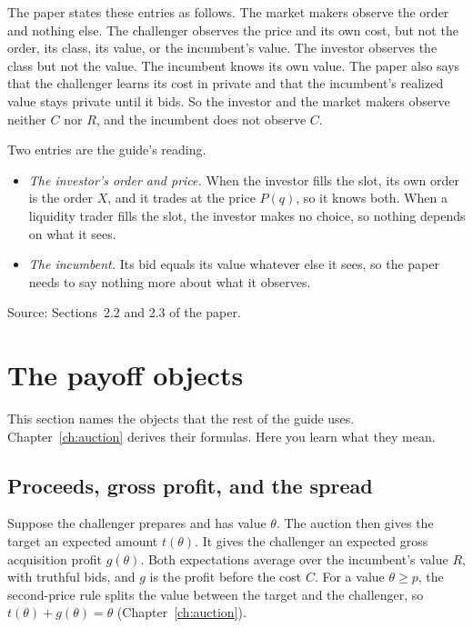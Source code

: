 The paper states these entries as follows.
The market makers observe the order and nothing else.
The challenger observes the price and its own cost, but not the order, its class, its value, or the incumbent's value.
The investor observes the class but not the value.
The incumbent knows its own value.
The paper also says that the challenger learns its cost in private and that the incumbent's realized value stays private until it bids.
So the investor and the market makers observe neither \(C\) nor \(R\), and the incumbent does not observe \(C\).

Two entries are the guide's reading.
\begin{itemize}
\item \emph{The investor's order and price.} When the investor fills the slot, its own order is the order \(X\), and it trades at the price \(P(q)\), so it knows both. When a liquidity trader fills the slot, the investor makes no choice, so nothing depends on what it sees.
\item \emph{The incumbent.} Its bid equals its value whatever else it sees, so the paper needs to say nothing more about what it observes.
\end{itemize}

{\small\color{notegrey}Source: Sections~2.2 and 2.3 of the paper.}

\section{The payoff objects}\label{sec:model-payoffs}

This section names the objects that the rest of the guide uses.
Chapter~\ref{ch:auction} derives their formulas. Here you learn what they mean.

\subsection*{Proceeds, gross profit, and the spread}

Suppose the challenger prepares and has value \(\theta\).
The auction then gives the target an expected amount \(t(\theta)\).
It gives the challenger an expected gross acquisition profit \(g(\theta)\).
Both expectations average over the incumbent's value \(R\), with truthful bids, and \(g\) is the profit before the cost \(C\).
For a value \(\theta\ge p\), the second-price rule splits the value between the target and the challenger, so \(t(\theta)+g(\theta)=\theta\) (Chapter~\ref{ch:auction}).

